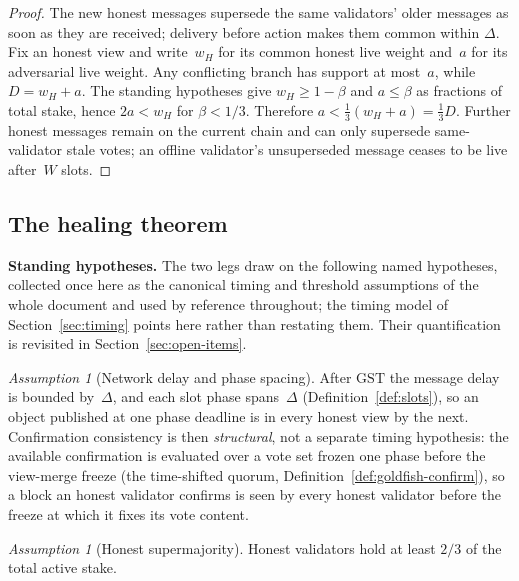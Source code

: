 \ifx\litemode\undefined\documentclass{article}\fi
\newcommand{\GST}{\ensuremath{\mathrm{GST}}\xspace}
\newcommand{\Dvote}{\ensuremath{D}}         %
\newcommand{\Wvote}{\ensuremath{W}}         %
\renewcommand{\paragraph}[1]{\vspace{7pt}\noindent\textbf{#1}}
\theoremstyle{plain}
\theoremstyle{definition}
\theoremstyle{remark}
\newtheorem{assumption}[theorem]{Assumption}
\begin{document}
\begin{proof}
The new honest messages supersede the same validators' older messages as soon
as they are received; delivery before action makes them common within
\(\Delta\).  Fix an honest view and write~\(w_H\) for its common honest live
weight and~\(a\) for its adversarial live weight.  Any conflicting branch has
support at most~\(a\), while \(\Dvote=w_H+a\).  The standing hypotheses give
\(w_H\geq1-\beta\) and \(a\leq\beta\) as fractions of total stake, hence
\(2a<w_H\) for \(\beta<1/3\).  Therefore
\(a<\tfrac13(w_H+a)=\tfrac13\Dvote\).  Further honest messages remain on the
current chain and can only supersede same-validator stale votes; an offline
validator's unsuperseded message ceases to be live after~\(\Wvote\) slots.
\end{proof}

\subsection{The healing theorem}\label{sec:healing-theorem}

\paragraph{Standing hypotheses.}
The two legs draw on the following named hypotheses, collected once here as the
canonical timing and threshold assumptions of the whole document and used by
reference throughout; the timing model of Section~\ref{sec:timing} points here
rather than restating them.
Their quantification is revisited in Section~\ref{sec:open-items}.

\begin{assumption}[Network delay and phase spacing]\label{ass:heal-delta}
After \GST{} the message delay is bounded by~\(\Delta\), and each slot phase
spans~\(\Delta\) (Definition~\ref{def:slots}), so an object published at one
phase deadline is in every honest view by the next.  Confirmation consistency is
then \emph{structural}, not a separate timing hypothesis: the available
confirmation is evaluated over a vote set frozen one phase before the view-merge
freeze (the time-shifted quorum, Definition~\ref{def:goldfish-confirm}), so a
block an honest validator confirms is seen by every honest validator before the
freeze at which it fixes its vote content.
\end{assumption}

\begin{assumption}[Honest supermajority]\label{ass:heal-honest}
Honest validators hold at least \(2/3\) of the total active stake.
\end{assumption}
\end{document}
